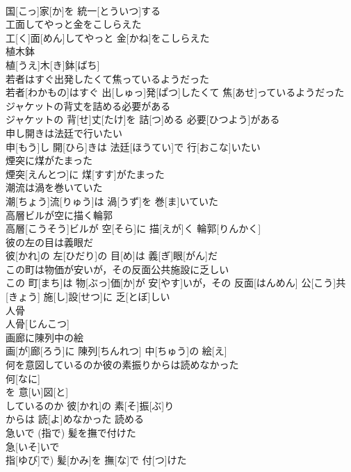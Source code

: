\documentclass[8pt]{extreport}
\begin{document}
\begin{CJK}{UTF8}{min}
\\	国[こっ]家[か]を 統一[とういつ]する
\\	工面してやっと金をこしらえた	
\\	工[く]面[めん]してやっと 金[かね]をこしらえた
\\	植木鉢	
\\	植[うえ]木[き]鉢[ばち]
\\	若者はすぐ出発したくて焦っているようだった	
\\	若者[わかもの]はすぐ 出[しゅっ]発[ぱつ]したくて 焦[あせ]っているようだった
\\	ジャケットの背丈を詰める必要がある	
\\	ジャケットの 背[せ]丈[たけ]を 詰[つ]める 必要[ひつよう]がある
\\	申し開きは法廷で行いたい	
\\	申[もう]し 開[ひら]きは 法廷[ほうてい]で 行[おこな]いたい
\\	煙突に煤がたまった	
\\	煙突[えんとつ]に 煤[すす]がたまった
\\	潮流は渦を巻いていた	
\\	潮[ちょう]流[りゅう]は 渦[うず]を 巻[ま]いていた
\\	高層ビルが空に描く輪郭	
\\	高層[こうそう]ビルが 空[そら]に 描[えが]く 輪郭[りんかく]
\\	彼の左の目は義眼だ	
\\	彼[かれ]の 左[ひだり]の 目[め]は 義[ぎ]眼[がん]だ
\\	この町は物価が安いが，その反面公共施設に乏しい	
\\	この 町[まち]は 物[ぶっ]価[か]が 安[やす]いが，その 反面[はんめん] 公[こう]共[きょう] 施[し]設[せつ]に 乏[とぼ]しい
\\	人骨	
\\	人骨[じんこつ]
\\	画廊に陳列中の絵	
\\	画[が]廊[ろう]に 陳列[ちんれつ] 中[ちゅう]の 絵[え]
\\	何を意図しているのか彼の素振りからは読めなかった	
\\	何[なに]
\\	を 意[い]図[と]
\\	しているのか 彼[かれ]の 素[そ]振[ぶ]り 
\\	からは 読[よ]めなかった 読める 
\\	急いで (指で) 髪を撫で付けた	
\\	急[いそ]いで
\\	指[ゆび]で) 髪[かみ]を 撫[な]で 付[つ]けた

\end{CJK}
\end{document}
